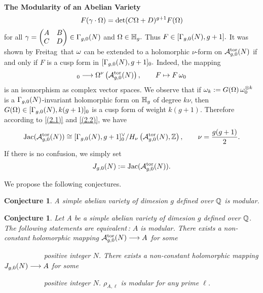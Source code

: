 \documentclass[11pt]{amsart}
\newtheorem{conjecture}[theorem]{Conjecture}
\begin{document}
\begin{section}{{\bf The Modularity of an Abelian Variety}}
\begin{equation*}
F(\gamma\cdot \Omega)=\det (C\Omega+D)^{g+1}F(\Omega)
\end{equation*}
for all $\gamma=\begin{pmatrix}
              A & B \\
              C & D
            \end{pmatrix}\in \Gamma_{g,0}(N)$ and $\Omega\in\mathbb H_g.$ Thus
$F\in [\Gamma_{g,0}(N),g+1].$ It was shown by Freitag\,\cite{Fr} that $\omega$ can be extended
to a holomorphic $\nu$-form on ${\mathcal A}_{g,0}^{\rm tor}(N)$ if and only if $F$ is
a cusp form in $[\Gamma_{g,0}(N),g+1]_0.$ Indeed, the mapping
\begin{equation*}
[\G_{g,0}(N),g+1]_0 \lrt \Omega^{\nu}
 \left( {\mathcal A}_{g,0}^{\rm tor}(N) \right),\qquad F\mapsto F\,\omega_0
\end{equation*}
is an isomorphism as complex vector spaces. We observe that if
$\omega_k:=G(\Omega)\, \omega_0^{\otimes k}$ is a $\Gamma_{g,0}(N)$-invariant
holomorphic form on $\mathbb H_g$ of degree $k\nu$, then $G(\Omega)\in [\Gamma_{g,0}(N),k(g+1)]_0$
is a cusp form of weight $k(g+1).$
\vskip 3mm
Therefore according to \eqref{(2.1)} and \eqref{(2.2)}, we have
\begin{equation}\label{(2.3)}
{{\rm Jac}}({\mathcal A}_{g,0}^{\rm tor}(N))
 \cong [\Gamma_{g,0}(N),g+1]_0^{\vee}
 / H_\nu \left( {\mathcal A}_{g,0}^{\rm tor}(N),\mathbb Z \right),\qquad \nu=\frac{g(g+1)}{2}.
\end{equation}
If there is no confusion, we simply set
$$
J_{g,0}(N):= {{\rm Jac}}({\mathcal A}_{g,0}^{\rm tor}(N)).
$$

\vskip 3mm
We propose the following conjectures.
\vskip 2mm \noindent
\begin{conjecture}\label{conj:2.7}
A simple abelian variety of dimesion $g$ defined over $\mathbb Q$ is modular.
\end{conjecture}
\vskip 3mm
\noindent
\begin{conjecture}\label{conj:2.8}
Let A be a simple abelian variety of dimesion $g$ defined over $\mathbb Q$.
The following statements are equivalent\,:
\vskip 2mm
{} $A$ is modular.
\vskip 1mm
{} There exists a non-constant holomorphic mapping
${\mathcal A}_{g,0}^{\rm tor}(N)\longrightarrow A$ for some
\par
\ \ \ \ \ \ \ \ \ \ \ positive integer $N$.
\vskip 1mm
{} There exists a non-constant holomorphic mapping
$J_{g,0}(N)\longrightarrow A$ for some
\par
\ \ \ \ \ \ \ \ \ \ \ positive integer $N$.
\vskip 1mm
{} $\rho_{A,\ell}$ is modular for any prime $\ell$.
\end{conjecture}


\end{section}
\end{document}
